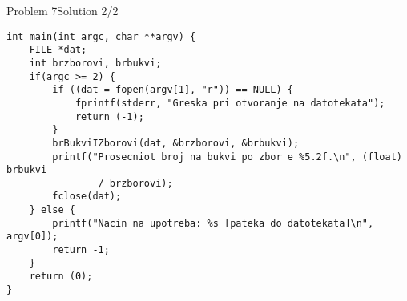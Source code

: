 \begin{frame}[fragile]{Problem 7}{Solution 2/2}
\begin{lstlisting}
int main(int argc, char **argv) {
    FILE *dat;
    int brzborovi, brbukvi;
    if(argc >= 2) {
        if ((dat = fopen(argv[1], "r")) == NULL) {
            fprintf(stderr, "Greska pri otvoranje na datotekata");
            return (-1);
        }
        brBukviIZborovi(dat, &brzborovi, &brbukvi);
        printf("Prosecniot broj na bukvi po zbor e %5.2f.\n", (float) brbukvi
                / brzborovi);
        fclose(dat);
    } else {
        printf("Nacin na upotreba: %s [pateka do datotekata]\n", argv[0]);
        return -1;
    }
    return (0);
}
\end{lstlisting}
\end{frame}

